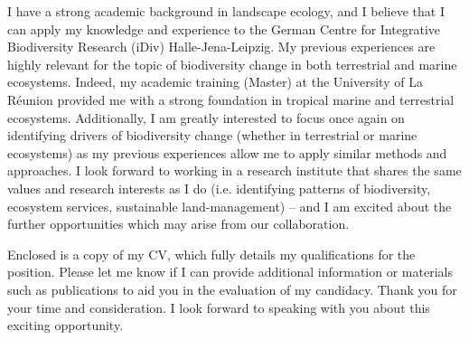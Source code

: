 \documentclass[11pt, a4paper]{awesome-cv}
\begin{document}
\begin{cvletter}
I have a strong academic background in landscape ecology, and I believe that I can apply my knowledge and experience to the German Centre for Integrative Biodiversity Research (iDiv) Halle-Jena-Leipzig. My previous experiences are highly relevant for the topic of biodiversity change in both terrestrial and marine ecosystems. Indeed, my academic training (Master) at the University of La Réunion provided me with a strong foundation in tropical marine and terrestrial ecosystems. Additionally, I am greatly interested to focus once again on identifying drivers of biodiversity change (whether in terrestrial or marine ecosystems) as my previous experiences allow me to apply similar methods and approaches. I look forward to working in a research institute that shares the same values and research interests as I do (i.e. identifying patterns of biodiversity, ecosystem services, sustainable land-management) – and I am excited about the further opportunities which may arise from our collaboration.

Enclosed is a copy of my CV, which fully details my qualifications for the position. Please let me know if I can provide additional information or materials such as publications to aid you in the evaluation of my candidacy. Thank you for your time and consideration. I look forward to speaking with you about this exciting opportunity. 

\end{cvletter}


\makeletterclosing
\end{document}
